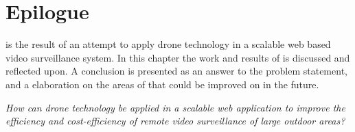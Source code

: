 \chapter{Epilogue}
\projectname{} is the result of an attempt to apply drone technology in a scalable web based video surveillance system.
In this chapter the work and results of \projectname{} is discussed and reflected upon.
A conclusion is presented as an answer to the problem statement, and a elaboration on the areas of \projectname{} that could be improved on in the future.


\textit{How can drone technology be applied in a scalable web application to improve the efficiency and cost-efficiency of remote video surveillance of large outdoor areas?}




